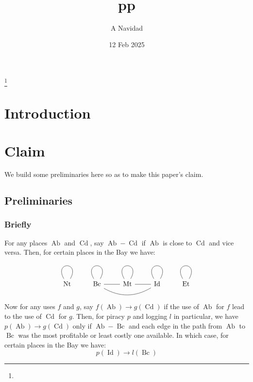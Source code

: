 \documentclass{amsart}
\DeclareMathOperator{\id}{Id}%
\DeclareMathOperator{\mt}{Mt}%
\DeclareMathOperator{\bc}{Bc}%
\DeclareMathOperator{\et}{Et}%
\DeclareMathOperator{\nt}{Nt}%
\DeclareMathOperator{\ab}{Ab}%
\DeclareMathOperator{\cd}{Cd}%
\theoremstyle{definition}%
\theoremstyle{definition}%
\theoremstyle{remark}%
\begin{document}
%
%
\title{pp}
\author{A Navidad}
\address{Harvard College, Cambridge MA}
\date{12 Feb 2025}
\thanks{\lipsum[1][1-3]}%
%
%
\begin{abstract}
\lipsum[1][1-6]
\end{abstract}
\keywords{\lipsum[1][1]}
%
%
\maketitle
%
%
%
%
\section{Introduction}
\label{s:intro}
\lipsum[1-2]
%
%
%
%
\section{Claim}%
\label{s:claim}
We build some preliminaries here so as to make this paper's claim.
%
\subsection{Preliminaries}
\subsubsection{Briefly} For any places \(\ab\) and \(\cd\), say \(\ab-\cd\) if \(\ab\) is close to \(\cd\) and vice versa. Then, for certain places in the Bay we have:
%
\begin{equation}
\label{}
\begin{tikzcd}[arrows=dash]
\nt \rar[out=120,in=60,loop] &\bc \rar \rar[out=120,in=60,loop] \ar[rr,bend right] &\mt \rar \rar[out=120,in=60,loop] &\id \rar[out=120,in=60,loop] &\et \rar[out=120,in=60,loop]
\end{tikzcd}
\end{equation}
%
Now for any uses \(f\) and \(g\), say \(f(\ab)\to g(\cd)\) if the use of \(\ab\) for \(f\) lead to the use of \(\cd\) for \(g\). Then, for piracy \(p\) and logging \(l\) in particular, we have \(p(\ab)\to g(\cd)\) only if \(\ab-\bc\) and each edge in the path from \(\ab\) to \(\bc\) was the most profitable or least costly one available. In which case, for certain places in the Bay we have:
%
\begin{equation}
\label{}
p(\id)\to l(\bc)
\end{equation}
%
\end{document}
